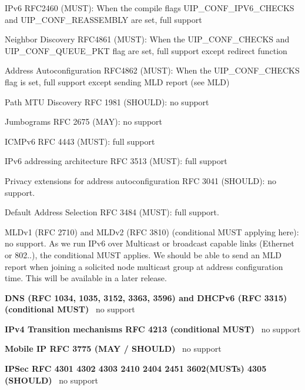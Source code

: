 \begin{DoxyItemize}
\item I\+Pv6 R\+F\+C2460 (M\+U\+ST)\+: When the compile flags U\+I\+P\+\_\+\+C\+O\+N\+F\+\_\+\+I\+P\+V6\+\_\+\+C\+H\+E\+C\+KS and U\+I\+P\+\_\+\+C\+O\+N\+F\+\_\+\+R\+E\+A\+S\+S\+E\+M\+B\+LY are set, full support \item Neighbor Discovery R\+F\+C4861 (M\+U\+ST)\+: When the U\+I\+P\+\_\+\+C\+O\+N\+F\+\_\+\+C\+H\+E\+C\+KS and U\+I\+P\+\_\+\+C\+O\+N\+F\+\_\+\+Q\+U\+E\+U\+E\+\_\+\+P\+KT flag are set, full support except redirect function \item Address Autoconfiguration R\+F\+C4862 (M\+U\+ST)\+: When the U\+I\+P\+\_\+\+C\+O\+N\+F\+\_\+\+C\+H\+E\+C\+KS flag is set, full support except sending M\+LD report (see M\+LD) \item Path M\+TU Discovery R\+FC 1981 (S\+H\+O\+U\+LD)\+: no support \item Jumbograms R\+FC 2675 (M\+AY)\+: no support \item I\+C\+M\+Pv6 R\+FC 4443 (M\+U\+ST)\+: full support \item I\+Pv6 addressing architecture R\+FC 3513 (M\+U\+ST)\+: full support \item Privacy extensions for address autoconfiguration R\+FC 3041 (S\+H\+O\+U\+LD)\+: no support. \item Default Address Selection R\+FC 3484 (M\+U\+ST)\+: full support. \item M\+L\+Dv1 (R\+FC 2710) and M\+L\+Dv2 (R\+FC 3810) (conditional M\+U\+ST applying here)\+: no support. As we run I\+Pv6 over Multicast or broadcast capable links (Ethernet or 802..), the conditional M\+U\+ST applies. We should be able to send an M\+LD report when joining a solicited node multicast group at address configuration time. This will be available in a later release.\end{DoxyItemize}
{\bfseries D\+NS (R\+FC 1034, 1035, 3152, 3363, 3596) and D\+H\+C\+Pv6 (R\+FC 3315) (conditional M\+U\+ST)}~\newline
 no support

{\bfseries I\+Pv4 Transition mechanisms R\+FC 4213 (conditional M\+U\+ST)}~\newline
 no support

{\bfseries Mobile IP R\+FC 3775 (M\+AY / S\+H\+O\+U\+LD)}~\newline
 no support

{\bfseries I\+P\+Sec R\+FC 4301 4302 4303 2410 2404 2451 3602(M\+U\+S\+Ts) 4305 (S\+H\+O\+U\+LD)}~\newline
 no support

